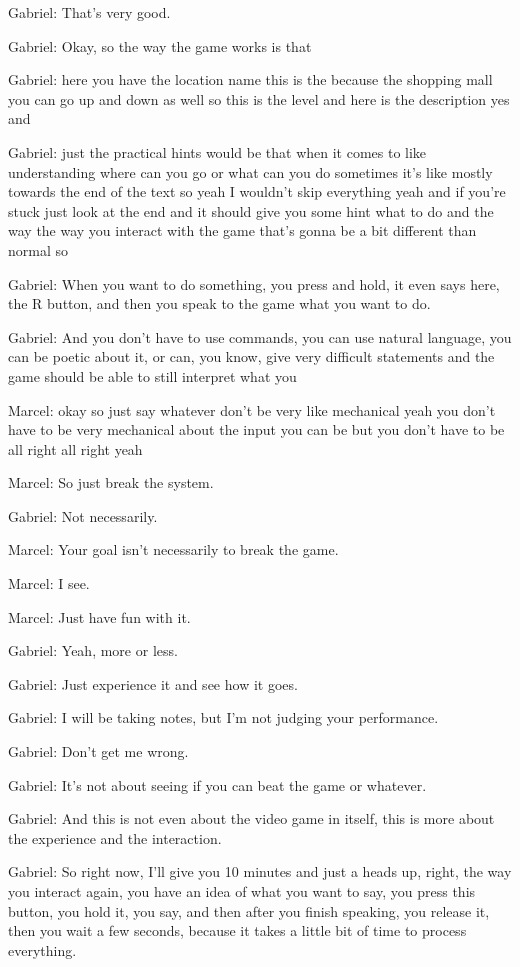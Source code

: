 Gabriel: That's very good.

Gabriel: Okay, so the way the game works is that

Gabriel: here you have the location name this is the because the shopping mall you can go up and down as well so this is the level and here is the description yes and

Gabriel: just the practical hints would be that when it comes to like understanding where can you go or what can you do sometimes it's like mostly towards the end of the text so yeah I wouldn't skip everything yeah and if you're stuck just look at the end and it should give you some hint what to do and the way the way you interact with the game that's gonna be a bit different than normal so

Gabriel: When you want to do something, you press and hold, it even says here, the R button, and then you speak to the game what you want to do.

Gabriel: And you don't have to use commands, you can use natural language, you can be poetic about it, or can, you know, give very difficult statements and the game should be able to still interpret what you

Marcel: okay so just say whatever don't be very like mechanical yeah you don't have to be very mechanical about the input you can be but you don't have to be all right all right yeah

Marcel: So just break the system.

Gabriel: Not necessarily.

Marcel: Your goal isn't necessarily to break the game.

Marcel: I see.

Marcel: Just have fun with it.

Gabriel: Yeah, more or less.

Gabriel: Just experience it and see how it goes.

Gabriel: I will be taking notes, but I'm not judging your performance.

Gabriel: Don't get me wrong.

Gabriel: It's not about seeing if you can beat the game or whatever.

Gabriel: And this is not even about the video game in itself, this is more about the experience and the interaction.

Gabriel: So right now, I'll give you 10 minutes and just a heads up, right, the way you interact again, you have an idea of what you want to say, you press this button, you hold it, you say, and then after you finish speaking, you release it, then you wait a few seconds, because it takes a little bit of time to process everything.

